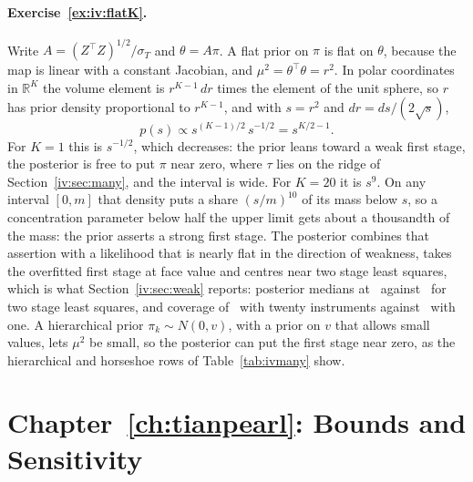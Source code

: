 \paragraph{Exercise~\ref{ex:iv:flatK}.} Write $A = (Z^\top Z)^{1/2}/\sigma_T$ and $\theta = A\pi$. A flat prior on $\pi$ is flat on $\theta$, because the map is linear with a constant Jacobian, and $\mu^2 = \theta^\top\theta = r^2$. In polar coordinates in $\mathbb{R}^K$ the volume element is $r^{K-1}\,dr$ times the element of the unit sphere, so $r$ has prior density proportional to $r^{K-1}$, and with $s = r^2$ and $dr = ds/(2\sqrt{s})$,
\[
p(s) \propto s^{(K-1)/2}\, s^{-1/2} = s^{K/2 - 1}.
\]
For $K = 1$ this is $s^{-1/2}$, which decreases: the prior leans toward a weak first stage, the posterior is free to put $\pi$ near zero, where $\tau$ lies on the ridge of Section~\ref{iv:sec:many}, and the interval is wide. For $K = 20$ it is $s^9$. On any interval $[0, m]$ that density puts a share $(s/m)^{10}$ of its mass below $s$, so a concentration parameter below half the upper limit gets about a thousandth of the mass: the prior asserts a strong first stage. The posterior combines that assertion with a likelihood that is nearly flat in the direction of weakness, takes the overfitted first stage at face value and centres near two stage least squares, which is what Section~\ref{iv:sec:weak} reports: posterior medians at \ivmanybmed\ against \ivmanytsls\ for two stage least squares, and coverage of \ivmanybcov\ with twenty instruments against \ivweakbcov\ with one. A hierarchical prior $\pi_k \sim N(0, v)$, with a prior on $v$ that allows small values, lets $\mu^2$ be small, so the posterior can put the first stage near zero, as the hierarchical and horseshoe rows of Table~\ref{tab:ivmany} show.

\section*{Chapter~\ref{ch:tianpearl}: Bounds and Sensitivity}

